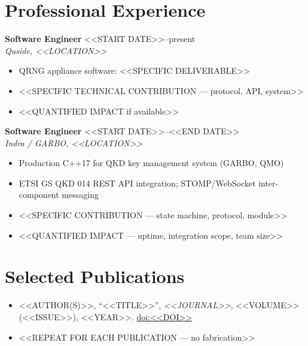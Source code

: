 \documentclass[10pt,a4paper]{article}
\newlength{\rightcolwidth}
\begin{document}
\begin{minipage}[t]{\rightcolwidth}


\section{Professional Experience}

\textbf{Software Engineer} \hfill <<START DATE>>--present\\
\textit{Quside, <<LOCATION>>}
\begin{itemize}
  \item QRNG appliance software: <<SPECIFIC DELIVERABLE>>
  \item <<SPECIFIC TECHNICAL CONTRIBUTION — protocol, API, system>>
  \item <<QUANTIFIED IMPACT if available>>
\end{itemize}

\vspace{4pt}

\textbf{Software Engineer} \hfill <<START DATE>>--<<END DATE>>\\
\textit{Indra / GARBO, <<LOCATION>>}
\begin{itemize}
  \item Production C++17 for QKD key management system (GARBO, QMO)
  \item ETSI GS QKD 014 REST API integration; STOMP/WebSocket
    inter-component messaging
  \item <<SPECIFIC CONTRIBUTION — state machine, protocol, module>>
  \item <<QUANTIFIED IMPACT — uptime, integration scope, team size>>
\end{itemize}


\section{Selected Publications}

\begin{itemize}
  \item <<AUTHOR(S)>>, ``<<TITLE>>'', \textit{<<JOURNAL>>},
    <<VOLUME>>(<<ISSUE>>), <<YEAR>>.
    \href{https://doi.org/<<DOI>>}{doi:<<DOI>>}
  \item <<REPEAT FOR EACH PUBLICATION — no fabrication>>
\end{itemize}


\end{minipage}
\end{document}
